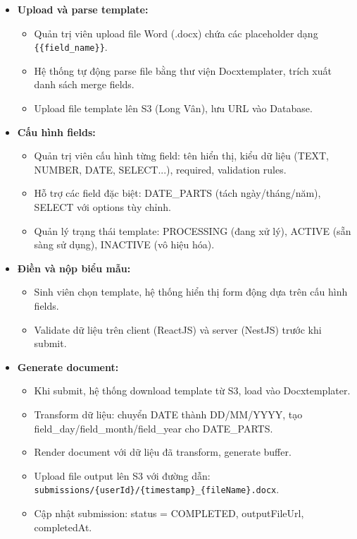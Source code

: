 \begin{itemize}
    \item \textbf{Upload và parse template:}
    \begin{itemize}
        \item Quản trị viên upload file Word (.docx) chứa các placeholder dạng \texttt{\{\{field\_name\}\}}.
        \item Hệ thống tự động parse file bằng thư viện Docxtemplater, trích xuất danh sách merge fields.
        \item Upload file template lên S3 (Long Vân), lưu URL vào Database.
    \end{itemize}
    
    \item \textbf{Cấu hình fields:}
    \begin{itemize}
        \item Quản trị viên cấu hình từng field: tên hiển thị, kiểu dữ liệu (TEXT, NUMBER, DATE, SELECT...), required, validation rules.
        \item Hỗ trợ các field đặc biệt: DATE\_PARTS (tách ngày/tháng/năm), SELECT với options tùy chỉnh.
        \item Quản lý trạng thái template: PROCESSING (đang xử lý), ACTIVE (sẵn sàng sử dụng), INACTIVE (vô hiệu hóa).
    \end{itemize}
    
    \item \textbf{Điền và nộp biểu mẫu:}
    \begin{itemize}
        \item Sinh viên chọn template, hệ thống hiển thị form động dựa trên cấu hình fields.
        \item Validate dữ liệu trên client (ReactJS) và server (NestJS) trước khi submit.
    \end{itemize}
    
    \item \textbf{Generate document:}
    \begin{itemize}
        \item Khi submit, hệ thống download template từ S3, load vào Docxtemplater.
        \item Transform dữ liệu: chuyển DATE thành DD/MM/YYYY, tạo field\_day/field\_month/field\_year cho DATE\_PARTS.
        \item Render document với dữ liệu đã transform, generate buffer.
        \item Upload file output lên S3 với đường dẫn: \texttt{submissions/\{userId\}/\{timestamp\}\_\{fileName\}.docx}.
        \item Cập nhật submission: status = COMPLETED, outputFileUrl, completedAt.
    \end{itemize}
    

\end{itemize}
